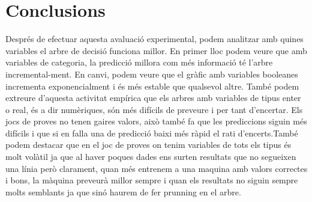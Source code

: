 \documentclass[11pt]{article}
\begin{document}
\section{Conclusions}
Després de efectuar aquesta avaluació experimental, podem analitzar amb quines variables el arbre de decisió funciona millor. En primer lloc podem veure que amb variables de categoria, la predicció millora com més informació té l'arbre incremental-ment. En canvi, podem veure que el gràfic amb variables booleanes incrementa exponencialment i és més estable que qualsevol altre. També podem extreure d'aquesta activitat empírica que els arbres amb variables de tipus enter o real, és a dir numèriques, són més difícils de preveure i per tant d'encertar. Els jocs de proves no tenen gaires valors, això també fa que les prediccions siguin més difícils i que si en falla una de predicció baixi més ràpid el rati d'encerts.També podem destacar que en el joc de proves on tenim variables de tots els tipus és molt volàtil ja que al haver poques dades ens surten resultats que no segueixen una línia però clarament, quan més entrenem a una maquina amb valors correctes i bons, la màquina preveurà millor sempre i quan els resultats no siguin sempre molts semblants ja que sinó haurem de fer prunning en el arbre.
\end{document}
